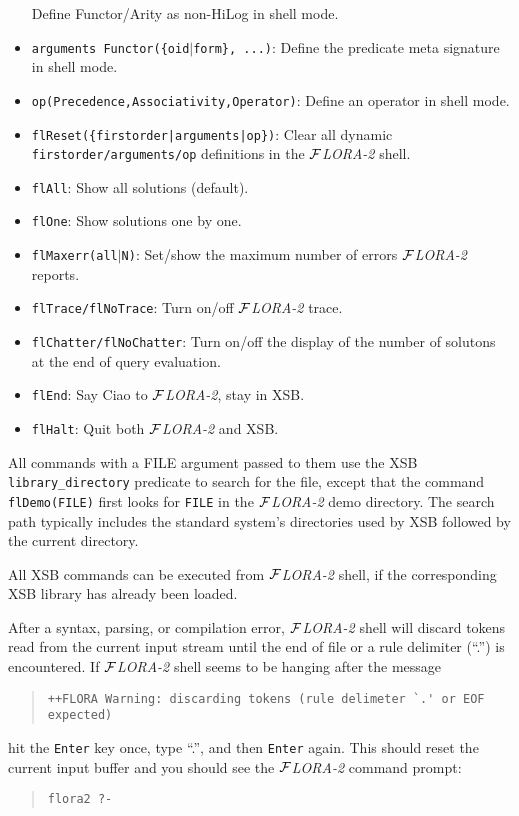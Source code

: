 \documentclass[11pt]{article}
\newcommand{\FLORA}{{\mbox{${\cal F}${\small\it LORA}\rm\emph{-2}}}\xspace}
\begin{document}
\begin{itemize}
    Define Functor/Arity as non-HiLog in shell mode.
\item {\tt arguments Functor(\{oid$|$form\}, ...)}:
    Define the predicate meta signature in shell mode.
\item {\tt op(Precedence,Associativity,Operator)}:
    Define an operator in shell mode.
\item {\tt flReset(\{firstorder|arguments|op\})}:
    Clear all dynamic {\tt firstorder/arguments/op}  definitions in the
    \FLORA shell.
\item {\tt flAll}:
    Show all solutions (default).
\item {\tt flOne}:
    Show solutions one by one.
\item {\tt flMaxerr(all$|$N)}:
    Set/show the maximum number of errors \FLORA reports.
\item {\tt flTrace/flNoTrace}:
    Turn on/off \FLORA trace.
\item {\tt flChatter/flNoChatter}:
    Turn on/off the display of the number of solutons at the end of query
    evaluation.
\item {\tt flEnd}:
    Say Ciao to \FLORA, stay in XSB.
\item {\tt flHalt}:
    Quit both \FLORA and XSB.
\end{itemize}
%

All commands with a FILE argument passed to them use the XSB
{\tt library\_directory} predicate to search for the file, except that the
command {\tt flDemo(FILE)} first looks for {\tt FILE} in the \FLORA demo
directory. The search path typically includes the standard system's
directories used by XSB followed by the current directory. 

All XSB commands can be executed from \FLORA shell, if the corresponding
XSB library has already been loaded.

After a syntax, parsing, or compilation error, \FLORA shell will
discard tokens read from the current input stream until the end of file or a
rule delimiter (``.'') is encountered. If \FLORA shell seems to be hanging
after the message
\begin{quote}
\begin{verbatim}
++FLORA Warning: discarding tokens (rule delimeter `.' or EOF expected)
\end{verbatim}
\end{quote}
hit the {\tt Enter} key once, type ``.'', and then {\tt Enter} again.  This
should reset the current input buffer and you should see the \FLORA command
prompt:
\begin{quote}
\begin{verbatim}
flora2 ?-
\end{verbatim}
\end{quote}
\end{document}
